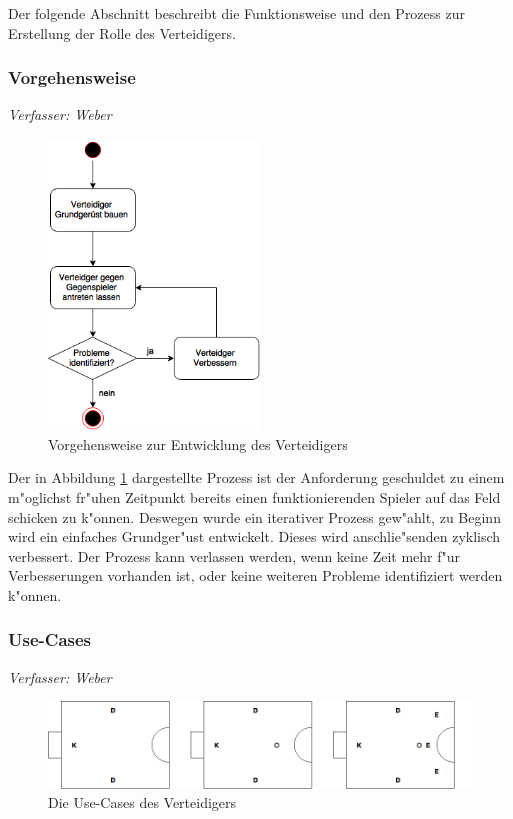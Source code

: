 Der folgende Abschnitt beschreibt die Funktionsweise und den Prozess zur Erstellung der Rolle des Verteidigers.

\subsubsection{Vorgehensweise}
\textit{Verfasser: Weber}\\

\begin{figure}[H]
	\centering
	\includegraphics[width=0.5\textwidth]{Grafiken/KI/defender/vorgehensweise.png}
	\caption{Vorgehensweise zur Entwicklung des Verteidigers}
	\label{Vorgehensweise-Verteidigers}
\end{figure}
Der in Abbildung \ref{Vorgehensweise-Verteidigers} dargestellte Prozess ist der Anforderung geschuldet zu einem m"oglichst fr"uhen Zeitpunkt bereits einen funktionierenden Spieler auf das Feld schicken zu k"onnen. Deswegen wurde ein iterativer Prozess gew"ahlt, zu Beginn wird ein einfaches Grundger"ust entwickelt. Dieses wird anschlie"senden zyklisch verbessert. Der Prozess kann verlassen werden, wenn keine Zeit mehr f"ur Verbesserungen vorhanden ist, oder keine weiteren Probleme identifiziert werden k"onnen.

\subsubsection{Use-Cases}
\textit{Verfasser: Weber}\\
\begin{figure}[H]
	\centering
	\includegraphics[width=\ScaleIfNeeded]{Grafiken/KI/defender/useCases.png}
	\caption{Die Use-Cases des Verteidigers}
	\label{Usecases-Verteidigers}
\end{figure}

